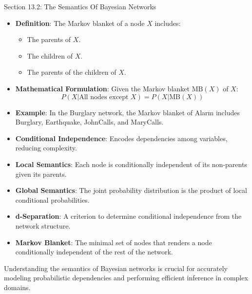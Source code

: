 \begin{notes}{Section 13.2: The Semantics Of Bayesian Networks}
\begin{highlight}
        \begin{itemize}
            \item \textbf{Definition}: The Markov blanket of a node $X$ includes:
                \begin{itemize}
                    \item The parents of $X$.
                    \item The children of $X$.
                    \item The parents of the children of $X$.
                \end{itemize}
            \item \textbf{Mathematical Formulation}: Given the Markov blanket $\text{MB}(X)$ of $X$:
            \[
            P(X | \text{All nodes except } X) = P(X | \text{MB}(X))
            \]
            \item \textbf{Example}: In the Burglary network, the Markov blanket of Alarm includes Burglary, Earthquake, JohnCalls, and MaryCalls.
        \end{itemize}
    
    \end{highlight}
    
    \begin{highlight}
    
        \begin{itemize}
            \item \textbf{Conditional Independence}: Encodes dependencies among variables, reducing complexity.
            \item \textbf{Local Semantics}: Each node is conditionally independent of its non-parents given its parents.
            \item \textbf{Global Semantics}: The joint probability distribution is the product of local conditional probabilities.
            \item \textbf{d-Separation}: A criterion to determine conditional independence from the network structure.
            \item \textbf{Markov Blanket}: The minimal set of nodes that renders a node conditionally independent of the rest of the network.
        \end{itemize}
    
        Understanding the semantics of Bayesian networks is crucial for accurately modeling probabilistic dependencies and performing efficient inference in complex domains.
    
    \end{highlight}
\end{notes}

